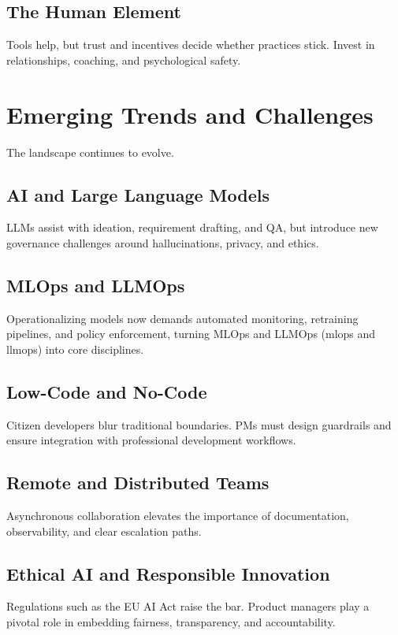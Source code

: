 \subsection{The Human Element}
Tools help, but trust and incentives decide whether practices stick. Invest in relationships, coaching, and psychological safety.

\section{Emerging Trends and Challenges}
\label{sec:trends}

The landscape continues to evolve.

\subsection{AI and Large Language Models}
LLMs assist with ideation, requirement drafting, and QA, but introduce new governance challenges around hallucinations, privacy, and ethics.

\subsection{MLOps and LLMOps}
Operationalizing models now demands automated monitoring, retraining pipelines, and policy enforcement, turning MLOps and LLMOps (\gls{mlops} and \gls{llmops}) into core disciplines.

\subsection{Low-Code and No-Code}
Citizen developers blur traditional boundaries. PMs must design guardrails and ensure integration with professional development workflows.

\subsection{Remote and Distributed Teams}
Asynchronous collaboration elevates the importance of documentation, observability, and clear escalation paths.

\subsection{Ethical AI and Responsible Innovation}
Regulations such as the EU AI Act raise the bar. Product managers play a pivotal role in embedding fairness, transparency, and accountability.

